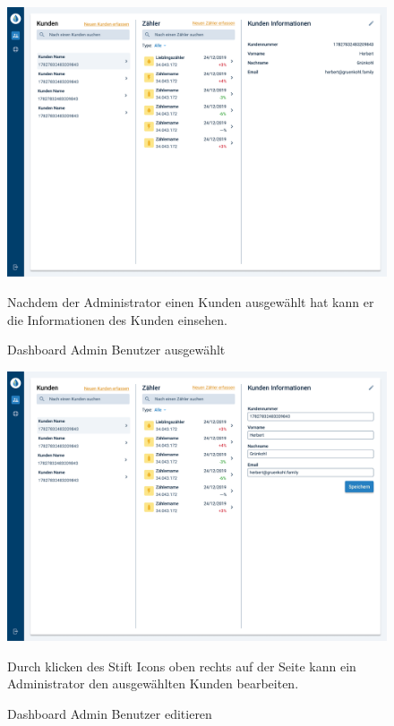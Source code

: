 \newpage

\begin{figure}[h]
	\centering
    \includegraphics[scale=0.3]{img/WebsiteMockup/Dashboard-Admin-UserSelected}
	\caption{Dashboard Admin Benutzer ausgewählt} \hfill \break
	Nachdem der Administrator einen Kunden ausgewählt hat kann er die Informationen des Kunden einsehen.
\end{figure}

\newpage

\begin{figure}[h]
	\centering
    \includegraphics[scale=0.3]{img/WebsiteMockup/Dashboard-Admin-UserSelected-Edit}
	\caption{Dashboard Admin Benutzer editieren}\hfill \break
	Durch klicken des Stift Icons oben rechts auf der Seite kann ein Administrator den ausgewählten Kunden bearbeiten.
\end{figure}
\newpage

